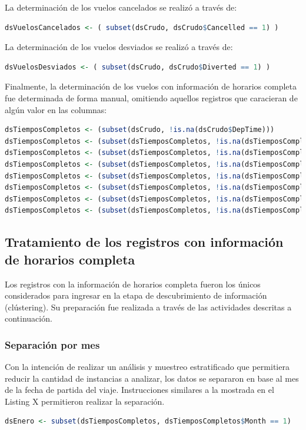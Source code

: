 \documentclass[12pt]{article}
\numberwithin{equation}{section}
\numberwithin{table}{section}
\numberwithin{figure}{section}
\begin{document}
La determinación de los vuelos cancelados se realizó a través de:
\begin{lstlisting}[language=R, caption=Detección de vuelos cancelados]
dsVuelosCancelados <- ( subset(dsCrudo, dsCrudo$Cancelled == 1) )
\end{lstlisting}


La determinación de los vuelos desviados se realizó a través de:
\begin{lstlisting}[language=R, caption=Detección de vuelos desviados]
dsVuelosDesviados <- ( subset(dsCrudo, dsCrudo$Diverted == 1) )
\end{lstlisting}

Finalmente, la determinación de los vuelos con información de horarios completa fue determinada de forma manual, omitiendo aquellos registros que caracieran de algún valor en las columnas:
\begin{lstlisting}[language=R, caption=Detección de vuelos con información de horarios completa]
dsTiemposCompletos <- (subset(dsCrudo, !is.na(dsCrudo$DepTime)))
dsTiemposCompletos <- (subset(dsTiemposCompletos, !is.na(dsTiemposCompletos$ArrTime)))
dsTiemposCompletos <- (subset(dsTiemposCompletos, !is.na(dsTiemposCompletos$CRSArrTime)))
dsTiemposCompletos <- (subset(dsTiemposCompletos, !is.na(dsTiemposCompletos$CRSDepTime)))
dsTiemposCompletos <- (subset(dsTiemposCompletos, !is.na(dsTiemposCompletos$ActualElapsedTime)))
dsTiemposCompletos <- (subset(dsTiemposCompletos, !is.na(dsTiemposCompletos$AirTime)))
dsTiemposCompletos <- (subset(dsTiemposCompletos, !is.na(dsTiemposCompletos$DepDelay)))
dsTiemposCompletos <- (subset(dsTiemposCompletos, !is.na(dsTiemposCompletos$ArrDelay)))
\end{lstlisting}

\subsection{Tratamiento de los registros con información de horarios completa}
Los registros con la información de horarios completa fueron los únicos considerados para ingresar en la etapa de descubrimiento de información (clústering). Su preparación fue realizada a través de las actividades descritas a continuación.

\subsubsection{Separación por mes}
Con la intención de realizar un análisis y muestreo estratificado que permitiera reducir la cantidad de instancias a analizar, los datos se separaron en base al mes de la fecha de partida del viaje.
Instrucciones similares a la mostrada en el Listing X permitieron realizar la separación.
\begin{lstlisting}[language=R, caption=Separación de registros de vuelos por mes]
dsEnero <- subset(dsTiemposCompletos, dsTiemposCompletos$Month == 1)
\end{lstlisting}
\end{document}
